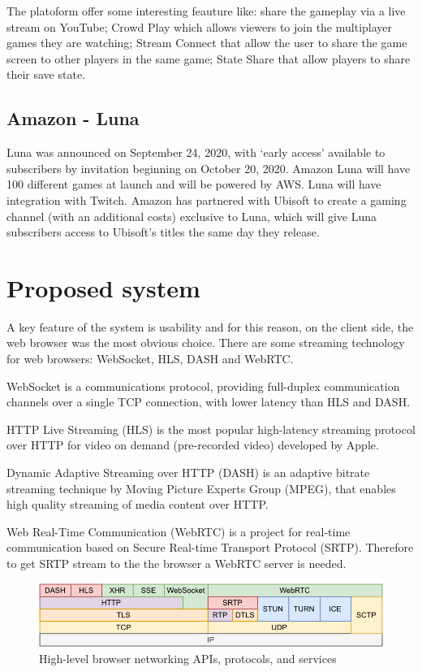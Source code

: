 The platoform offer some interesting feauture like: share the gameplay via a live stream on YouTube; Crowd Play which allows viewers to join the multiplayer games they are watching; Stream Connect that allow the user to share the game screen to other players in the same game; State Share that allow players to share their save state\cite{Google_Stadia}.

\subsection{Amazon - Luna}
Luna was announced on September 24, 2020, with ‘early access’ available to subscribers by invitation beginning on October 20, 2020. Amazon Luna will have 100 different games at launch and will be powered by AWS. Luna will have integration with Twitch. Amazon has partnered with Ubisoft to create a gaming channel (with an additional costs) exclusive to Luna, which will give Luna subscribers access to Ubisoft's titles the same day they release\cite{Amazon_Luna}.


\section{Proposed system}
A key feature of the system is usability and for this reason, on the client side, the web browser was the most obvious choice.
There are some streaming technology for web browsers: WebSocket, HLS, DASH and WebRTC\cite{Audio_and_video_delivery}.

WebSocket is a communications protocol, providing full-duplex communication channels over a single TCP connection, with lower latency than HLS and DASH.

HTTP Live Streaming (HLS) is the most popular high-latency streaming protocol over HTTP for video on demand (pre-recorded video) developed by Apple.

Dynamic Adaptive Streaming over HTTP (DASH) is an adaptive bitrate streaming technique by Moving Picture Experts Group (MPEG), that enables high quality streaming of media content over HTTP.

Web Real-Time Communication (WebRTC) is a project for real-time communication based on Secure Real-time Transport Protocol (SRTP). Therefore to get SRTP stream to the the browser a WebRTC server is needed\cite{High_Performance_Browser_Networking}.

\begin{figure}[H]
	\includegraphics[width=\linewidth]{immagini/webprotocols}
	\caption{High-level browser networking APIs, protocols, and services }
	\label{fig:webprotocols}
\end{figure}

